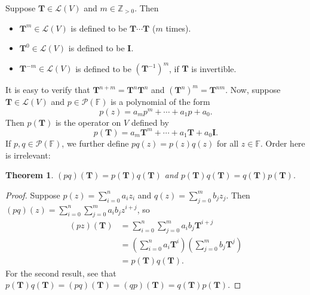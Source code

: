 \documentclass[11pt]{article}
\newcommand{\mat}[1]{\mathbf{#1}}
\newtheorem{theorem}{Theorem}
\begin{document}
Suppose $\mat{T} \in \mathcal{L}(V)$ and $m \in \mathbb{Z}_{> 0}$. Then
\begin{itemize}
	\item $\mat{T}^{m} \in \mathcal{L}(V)$ is defined to be $\mat{T} \cdots \mat{T}$ ($m$ times).
	\item $\mat{T}^{0} \in \mathcal{L}(V)$ is defined to be $\mat{I}$.
	\item $\mat{T}^{-m} \in \mathcal{L}(V)$ is defined to be $(\mat{T}^{-1})^{m}$, if $\mat{T}$ is invertible.
\end{itemize}

It is easy to verify that $\mat{T}^{n + m} = \mat{T}^{n} \mat{T}^{n}$ and $(\mat{T}^{n})^{m} = \mat{T}^{nm}$. Now, suppose $\mat{T} \in \mathcal{L}(V)$ and $p \in \mathcal{P}(\mathbb{F})$ is a polynomial of the form
\[
	p(z) = a_{m} p^{m} + \cdots + a_{1} p + a_{0}.
\]
Then $p(\mat{T})$ is the operator on $V$ defined by
\[
	p(\mat{T}) = a_{m} \mat{T}^{m} + \cdots + a_{1} \mat{T} + a_{0} \mat{I}.
\]
If $p, q \in \mathcal{P}(\mathbb{F})$, we further define $pq (z) = p(z)q(z)$ for all $z \in \mathbb{F}$. Order here is irrelevant:

\begin{theorem}
	$(pq)(\mat{T}) = p(\mat{T})q(\mat{T})$ and $p(\mat{T})q(\mat{T}) = q(\mat{T})p(\mat{T})$.
\end{theorem}
\begin{adjustwidth}{1cm}{}
    \begin{proof}
		Suppose $p(z) = \sum\limits_{i = 0}^{n} a_{i}z_{i}$ and $q(z) = \sum\limits_{j = 0}^{m} b_{j}z_{j}$. Then $(pq)(z) = \sum\limits_{i = 0}^{n} \sum\limits_{j = 0}^{m} a_{i}b_{j}z^{i + j}$, so
		\begin{align*}
			(pz)(\mat{T}) &= \sum_{i = 0}^{n} \sum_{j = 0}^{m} a_{i}b_{j}\mat{T}^{i + j} \\
			&= \left( \sum_{i = 0}^{n} a_{i} \mat{T}^{i} \right) \left( \sum_{j = 0}^{m} b_{j} \mat{T}^{j} \right) \\
			&= p(\mat{T})q(\mat{T}).
		\end{align*}
		For the second result, see that $p(\mat{T})q(\mat{T}) = (pq)(\mat{T}) = (qp)(\mat{T}) = q(\mat{T})p(\mat{T})$.
	\end{proof}
\end{adjustwidth}
\end{document}
